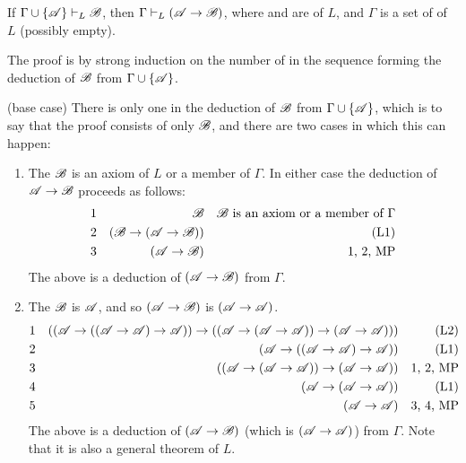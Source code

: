 \setcounter{definition}{7}
\begin{proposition}
  If \(\Gamma \cup \{\mathscr{A}\} \vdash_{L} \mathscr{B}\), then \(\Gamma \vdash_{L} (\mathscr{A} \rightarrow \mathscr{B})\), where \Cua{} and \Cub{} are \wfs{} of \(L\), and \(\Gamma\) is a set of \wfs{} of \(L\) (possibly empty).

  \prf{} The proof is by strong induction on the number of \wfs{} in the sequence forming the deduction of \(\mathscr{B}\) from \(\Gamma \cup \{\mathscr{A}\}\).

  (base case) There is only one \wf{} in the deduction of \(\mathscr{B}\) from \(\Gamma \cup \{\mathscr{A}\}\), which is to say that the proof consists of only \(\mathscr{B}\), and there are two cases in which this can happen:
  \begin{enumerate}
    \item The \wf{} \(\mathscr{B}\) is an axiom of \(L\) or a member of \(\Gamma\). In either case the deduction of \(\mathscr{A} \rightarrow \mathscr{B}\) proceeds as follows:
      \begin{align*}
        \text{1}&&
        \mathscr{B}&&
        \text{\(\ensuremath\mathscr{B}\) is an axiom or a member of \(\Gamma\)}\\
        \text{2}&&
        (\mathscr{B} \rightarrow (\mathscr{A} \rightarrow \mathscr{B}))&&
        \text{(L1)}\\
        \text{3}&&
        (\mathscr{A} \rightarrow \mathscr{B})&&
        \text{1, 2, MP}
      \end{align*}
      The above is a deduction of \((\mathscr{A} \rightarrow \mathscr{B})\) from \(\Gamma\).

    \item The \wf{} \(\mathscr{B}\) is \(\mathscr{A}\), and so \((\mathscr{A} \rightarrow \mathscr{B})\) is \((\mathscr{A} \rightarrow \mathscr{A})\). 
      \begin{align*}
        \text{1}&&
        ((\mathscr{A} \rightarrow ((\mathscr{A} \rightarrow \mathscr{A}) \rightarrow \mathscr{A})) \rightarrow ((\mathscr{A} \rightarrow (\mathscr{A} \rightarrow \mathscr{A})) \rightarrow (\mathscr{A} \rightarrow \mathscr{A})))&&
        \text{(L2)}\\
        \text{2}&&
        (\mathscr{A} \rightarrow ((\mathscr{A} \rightarrow \mathscr{A}) \rightarrow \mathscr{A}))&&
        \text{(L1)}\\
        \text{3}&&
        ((\mathscr{A} \rightarrow (\mathscr{A} \rightarrow \mathscr{A})) \rightarrow (\mathscr{A} \rightarrow \mathscr{A}))&&
        \text{1, 2, MP}\\
        \text{4}&&
        (\mathscr{A} \rightarrow (\mathscr{A} \rightarrow \mathscr{A}))&&
        \text{(L1)}\\
        \text{5}&&
        (\mathscr{A} \rightarrow \mathscr{A})&&
        \text{3, 4, MP}
      \end{align*}
      The above is a deduction of \((\mathscr{A} \rightarrow \mathscr{B})\) (which is \((\mathscr{A} \rightarrow \mathscr{A})\)) from \(\Gamma\). Note that it is also a general theorem of \(L\).
  \end{enumerate}


\end{proposition}
